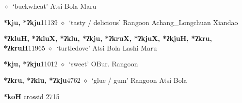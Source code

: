 \begin{list}{}{\leftmargin=1.5em \itemindent=-1.5em}
         $\diamond$~`buckwheat'
         Atsi 
\hspace{1ex}
         Bola 
\hspace{1ex}
         Maru 
  \item {\footnotesize \textbf{*kju, *ʔkju}}{\tiny 11139}
\hspace{1ex}
         $\diamond$~`tasty / delicious'
         Rangoon 
\hspace{1ex}
         Achang\_Longchuan 
\hspace{1ex}
         Xiandao 
  \item {\footnotesize \textbf{*ʔkluH, *ʔkluX, *ʔklu, *ʔkju, *ʔkruX, *ʔkjuX, *ʔkjuH, *ʔkru, *ʔkruH}}{\tiny 11965}
\hspace{1ex}
         $\diamond$~`turtledove'
         Atsi 
\hspace{1ex}
         Bola 
\hspace{1ex}
         Lashi 
\hspace{1ex}
         Maru 
  \item {\footnotesize \textbf{*kju, *ʔkju}}{\tiny 11012}
\hspace{1ex}
         $\diamond$~`sweet'
         OBur. 
\hspace{1ex}
         Rangoon 
  \item {\footnotesize \textbf{*ʔkru, *ʔklu, *ʔkju}}{\tiny 4762}
\hspace{1ex}
         $\diamond$~`glue / gum'
         Rangoon 
\hspace{1ex}
         Atsi 
\hspace{1ex}
         Bola 
  \end{list}
\item
\textbf{*koH}
  {\tiny crossid 2715}
